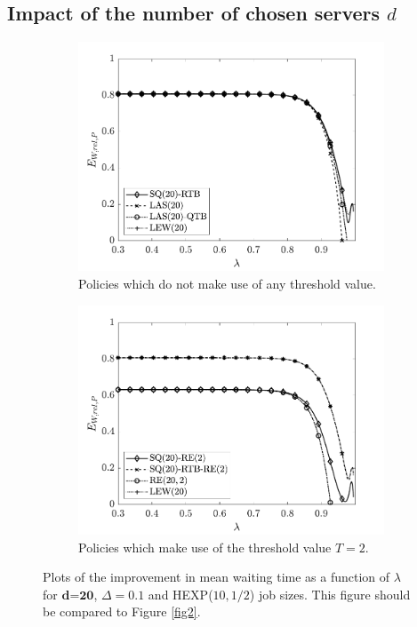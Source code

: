 \documentclass[12pt]{report}
\begin{document}
\subsection{Impact of the number of chosen servers $d$} \label{sec:num_d}
\begin{figure}[t]
\begin{center}
\begin{subfigure}{0.43\textwidth}
\centering
\captionsetup{width=.8\linewidth}
\includegraphics[width=1\linewidth]{figures/Chapter7/fig3a.pdf}
\caption{Policies which do not make use of any threshold value.}
\label{fig5a}
\end{subfigure}
\begin{subfigure}{.43\textwidth}
\centering
\captionsetup{width=.8\linewidth}
\includegraphics[width=1\linewidth]{figures/Chapter7/fig3b.pdf}
\caption{Policies which make use of the threshold value $T=2$.}
\label{fig5b}
\end{subfigure}
\caption{Plots of the improvement in mean waiting time as a function of $\lambda$ for $\textbf{d=20}$, $\Delta=0.1$ and HEXP($10,1/2$) job sizes. This figure should be compared to Figure \ref{fig2}.}
\label{fig5}
\end{center}
\end{figure}
\end{document}
